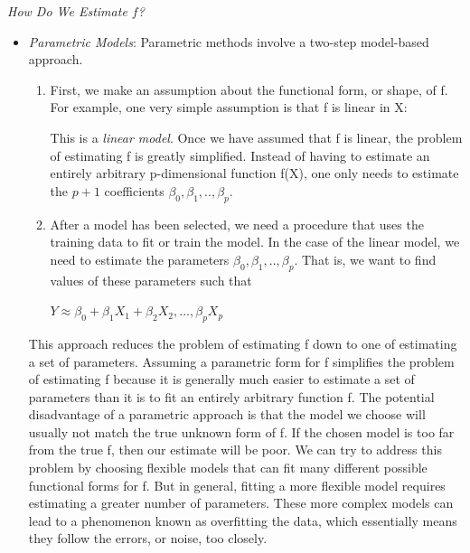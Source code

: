 \documentclass[12pt,a4paper]{article}
\begin{document}
\newpage
\textit{How Do We Estimate $f$?}
\begin{itemize}
\item \textit{Parametric Models}: Parametric methods involve a two-step model-based approach. 
\begin{enumerate}
\item First, we make an assumption about the functional form, or shape, of f. For example, one very simple assumption is that f is linear in X: 
\begin{center}
\end{center}
This is a \textit{linear model}. Once we have assumed that f is linear, the problem of estimating f is greatly simplified. Instead of having to estimate an entirely arbitrary p-dimensional function f(X), one only needs to estimate the $p+1$ coefficients $\beta_{0},\beta_{1},..,\beta_{p}$.
\item After a model has been selected, we need a procedure that uses the training data to fit or train the model. In the case of the linear model, we need to estimate the parameters $\beta_{0},\beta_{1},..,\beta_{p}$.  That is, we want to find values of these parameters such that
\begin{center}
$Y \approx \beta_{0}+\beta_{1}X_{1}+\beta_{2}X_{2},...,\beta_{p}X_{p}$
\end{center}
\end{enumerate}

This approach reduces the problem of estimating f down to one of estimating a set of parameters.  Assuming a parametric form for f simplifies the problem of estimating f because it is generally much easier to estimate a set of parameters than it is to fit an entirely arbitrary function f.  The potential disadvantage of a parametric approach is that the model we choose will usually not match the true unknown form of f. If the chosen model is too far from the true f, then our estimate will be poor. We can try to address this problem by choosing flexible models that can fit many different possible functional forms for f. But in general, fitting a more flexible model requires estimating a greater number of parameters. These more complex models can lead to a phenomenon known as overfitting the data, which essentially means they follow the errors, or noise, too closely.


\end{itemize}
\end{document}
